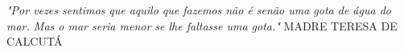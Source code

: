 \pretextualchapter{}

\vspace*{15cm}
\hspace{.4\textwidth}
\begin{minipage}{.5\textwidth}
	\textit{"Por vezes sentimos que aquilo que fazemos não é senão uma gota de água do mar. Mas o mar seria menor se lhe faltasse uma gota."}
	\flushright
	MADRE TERESA DE CALCUTÁ
\end{minipage}